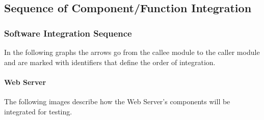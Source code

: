 \documentclass{article}
\begin{document}
\subsection{Sequence of Component/Function Integration}
\subsubsection{Software Integration Sequence}
In the following graphs the arrows go 
from the callee module to the caller module
and are marked with identifiers that define
the order of integration.
\paragraph{Web Server}
The following images describe how the Web Server's 
components will be integrated for testing.
\begin{figure}[H]
\end{figure}
\begin{figure}[H]
\end{figure}
\end{document}
